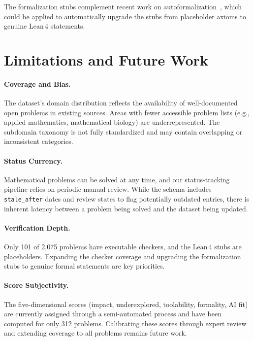 \documentclass[11pt]{article}
\begin{document}
The formalization stubs complement recent work on autoformalization~\citep{wu2022autoformalization,glazer2024formalconjectures}, which could be applied to automatically upgrade the stubs from placeholder axioms to genuine Lean\,4 statements.

\section{Limitations and Future Work}
\label{sec:limitations}

\paragraph{Coverage and Bias.}
The dataset's domain distribution reflects the availability of well-documented open problems in existing sources.
Areas with fewer accessible problem lists (e.g., applied mathematics, mathematical biology) are underrepresented.
The subdomain taxonomy is not fully standardized and may contain overlapping or inconsistent categories.

\paragraph{Status Currency.}
Mathematical problems can be solved at any time, and our status-tracking pipeline relies on periodic manual review.
While the schema includes \texttt{stale\_after} dates and review states to flag potentially outdated entries, there is inherent latency between a problem being solved and the dataset being updated.

\paragraph{Verification Depth.}
Only 101 of 2{,}075 problems have executable checkers, and the Lean\,4 stubs are placeholders.
Expanding the checker coverage and upgrading the formalization stubs to genuine formal statements are key priorities.

\paragraph{Score Subjectivity.}
The five-dimensional scores (impact, underexplored, toolability, formality, AI fit) are currently assigned through a semi-automated process and have been computed for only 312 problems.
Calibrating these scores through expert review and extending coverage to all problems remains future work.
\end{document}
